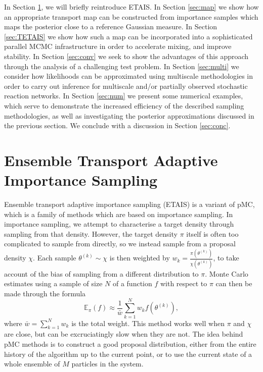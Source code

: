 \documentclass[final]{siamltex}
\begin{document}

In Section \ref{sec:ETAIS}, we will briefly reintroduce ETAIS. In Section \ref{sec:map} we show how an appropriate transport map can
be constructed from importance samples which maps the posterior close
to a reference Gaussian measure. In Section \ref{sec:TETAIS} we show
how such a map can be incorporated into a sophisticated parallel MCMC
infrastructure in order to accelerate mixing, and improve stability. In Section
\ref{sec:conv} we seek to show the advantages of this approach through
the analysis of a challenging test problem. In Section
\ref{sec:multi} we consider how likelihoods can be approximated using
 multiscale methodologies in order to carry out inference for
multiscale and/or partially observed stochastic reaction networks. In
Section \ref{sec:num} we present some numerical examples, which serve
to demonstrate the increased efficiency of the described sampling
methodologies, as well as investigating the posterior approximations
discussed in the previous section. We conclude with a discussion in
Section \ref{sec:conc}.

\section{Ensemble Transport Adaptive Importance Sampling}\label{sec:ETAIS}
Ensemble transport adaptive importance sampling (ETAIS)\cite{cotter2015parallel} is a variant of pMC\cite{cappe2012population}, which is a family of methods which are based
on importance sampling. In importance sampling, we attempt to
characterise a target density through sampling from that
density. However, the target density $\pi$ itself is often too complicated to sample
from directly, so we instead sample from a
proposal density $\chi$. Each sample $\theta^{(k)} \sim \chi$ is then weighted by
$w_k = \frac{\pi(\theta^{(k)})}{\chi(\theta^{(k)})}$, to take account of the bias of
sampling from a different distribution to $\pi$. Monte Carlo estimates
using a sample of size $N$
of a function $f$ with respect to $\pi$ can then be made through the
formula
\[\mathbb{E}_\pi(f) \approx \frac{1}{\bar{w}} \sum_{k=1}^N
  w_kf(\theta^{(k)}),\]
where $\bar{w} = \sum_{k=1}^N w_k$ is the total weight.
This method works well when $\pi$ and $\chi$ are close, but can be
excruciatingly slow when they are not. The idea behind pMC methods is
to construct a good proposal distribution, either from the entire
history of the algorithm up to the current point, or to use the
current state of a whole ensemble of $M$ particles in the system.
\end{document}
